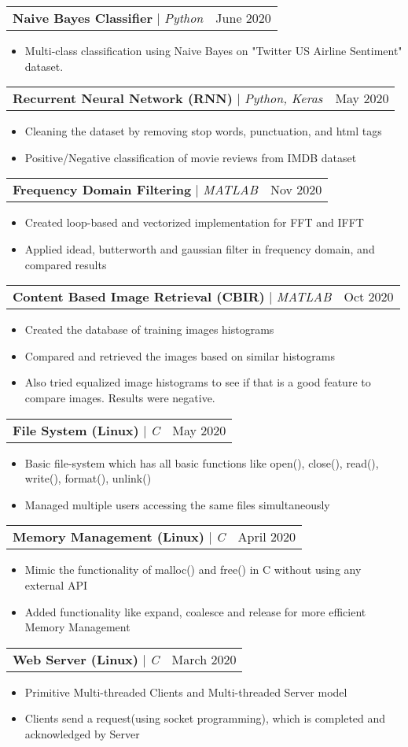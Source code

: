 \documentclass[letterpaper,11pt]{article}
\makeatletter
\newcommand{\resumeItem}[1]{
  \item\small{
    {#1 \vspace{-2pt}}
  }
}
\newcommand{\resumeProjectHeading}[2]{
    \item
    \begin{tabular*}{0.97\textwidth}{l@{\extracolsep{\fill}}r}
      \small#1 & #2 \\
    \end{tabular*}\vspace{-7pt}
}
\newcommand{\resumeItemListStart}{\begin{itemize}}
\newcommand{\resumeItemListEnd}{\end{itemize}\vspace{-5pt}}
\makeatother
\begin{document}
      \resumeProjectHeading
          {\textbf{Naive Bayes Classifier} $|$ \emph{Python}}{June 2020}
          \resumeItemListStart
            \resumeItem{Multi-class classification using Naive Bayes on "Twitter US Airline Sentiment" dataset.}
          \resumeItemListEnd          
          
      \resumeProjectHeading
          {\textbf{Recurrent Neural Network (RNN)} $|$ \emph{Python, Keras}}{May 2020}
          \resumeItemListStart
            \resumeItem{Cleaning the dataset by removing stop words, punctuation, and html tags}
            \resumeItem{Positive/Negative classification of movie reviews from IMDB dataset}
          \resumeItemListEnd

      \resumeProjectHeading
          {\textbf{Frequency Domain Filtering} $|$ \emph{MATLAB}}{Nov 2020}
          \resumeItemListStart
            \resumeItem{Created loop-based and vectorized implementation for FFT and IFFT}
            \resumeItem {Applied idead, butterworth and gaussian filter in frequency domain, and compared results}
          \resumeItemListEnd
         
      \resumeProjectHeading
          {\textbf{Content Based Image Retrieval (CBIR)} $|$ \emph{MATLAB}}{Oct 2020}
          \resumeItemListStart
            \resumeItem{Created the database of training images histograms}
            \resumeItem {Compared and retrieved the images based on similar histograms}
            \resumeItem{Also tried equalized image histograms to see if that is a good feature to compare images. Results were negative.}
          \resumeItemListEnd
         
      \resumeProjectHeading
          {\textbf{File System (Linux)} $|$ \emph{C}}{May 2020}
          \resumeItemListStart
            \resumeItem{Basic file-system which has all basic functions like open(), close(), read(), write(), format(), unlink()}
            \resumeItem {Managed multiple users accessing the same files simultaneously }
          \resumeItemListEnd
          
      \resumeProjectHeading
          {\textbf{Memory Management (Linux)} $|$ \emph{C}}{April 2020}
          \resumeItemListStart
            \resumeItem{Mimic the functionality of malloc() and free() in C without using any external API }
            \resumeItem {Added functionality like expand, coalesce and release for more efficient Memory Management}
          \resumeItemListEnd          
          
      \resumeProjectHeading
          {\textbf{Web Server (Linux)} $|$ \emph{C}}{March 2020}
          \resumeItemListStart
            \resumeItem{Primitive Multi-threaded Clients and Multi-threaded Server model }
            \resumeItem{Clients send a request(using socket programming), which is completed and acknowledged by Server}
          \resumeItemListEnd     
\end{document}
